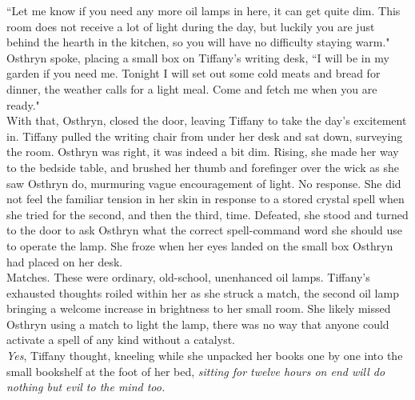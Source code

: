 ``Let me know if you need any more oil lamps in here, it can get quite dim. This room does not receive a lot of light during the day, but luckily you are just behind the hearth in the kitchen, so you will have no difficulty staying warm." Osthryn spoke, placing a small box on Tiffany's writing desk, ``I will be in my garden if you need me. Tonight I will set out some cold meats and bread for dinner, the weather calls for a light meal. Come and fetch me when you are ready."\\

With that, Osthryn, closed the door, leaving Tiffany to take the day's excitement in. 
Tiffany pulled the writing chair from under her desk and sat down, surveying the room. 
Osthryn was right, it was indeed a bit dim.
Rising, she made her way to the bedside table, and brushed her thumb and forefinger over the wick as she saw Osthryn do, murmuring vague encouragement of light.
No response. 
She did not feel the familiar tension in her skin in response to a stored crystal spell when she tried for the second, and then the third, time.
Defeated, she stood and turned to the door to ask Osthryn what the correct spell-command word she should use to operate the lamp.
She froze when her eyes landed on the small box Osthryn had placed on her desk.\\

Matches. These were ordinary, old-school, unenhanced oil lamps.
Tiffany's exhausted thoughts roiled within her as she struck a match, the second oil lamp bringing a welcome increase in brightness to her small room.
She likely missed Osthryn using a match to light the lamp, there was no way that anyone could activate a spell of any kind without a catalyst.\\

\textit{Yes}, Tiffany thought, kneeling while she unpacked her books one by one into the small bookshelf at the foot of her bed, \textit{sitting for twelve hours on end will do nothing but evil to the mind too.}